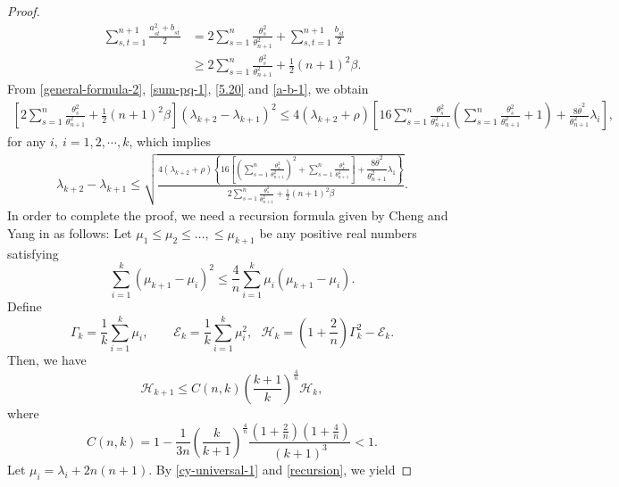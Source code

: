 \documentclass[12pt]{article}
\numberwithin{equation}{section}
\begin{document}
\begin{proof}
\begin{equation}\begin{aligned}\label{a-b-1}\sum^{n+1}_{s,t=1}\frac{a_{s\overline{t}}^{2}+b_{s\overline{t}}}{2}&=2\sum^{n}_{s=1}\frac{\theta_{s}^{2}}{\theta_{n+1}^{2}}
+\sum_{s,t=1}^{n+1}\frac{b_{s\overline{t}}}{2}\\&\geq2\sum^{n}_{s=1}\frac{\theta_{s}^{2}}{\theta_{n+1}^{2}}+\frac{1}{2}(n+1)^{2}\beta.\end{aligned}\end{equation}
From \eqref{general-formula-2}, \eqref{sum-pq-1}, \eqref{5.20} and \eqref{a-b-1}, we obtain
\begin{equation*}\begin{aligned}\left[2\sum^{n}_{s=1}\frac{\theta_{s}^{2}}{\theta_{n+1}^{2}}+\frac{1}{2}(n+1)^{2}\beta\right]\left(\lambda_{k+2}-\lambda_{k+1}\right)^{2}
\leq4(\lambda_{k+2}+\rho)\left[16\sum^{n}_{s=1}\frac{\theta_{s}^{2}}{\theta_{n+1}^{2}}\left(\sum^{n}_{s=1}\frac{\theta_{s}^{2}}{\theta_{n+1}^{2}} + 1\right)
+\frac{8\overline{\theta}^{2}}{\theta^{2}_{n+1}}\lambda_{i}\right],
\end{aligned}\end{equation*}for any $i,~i=1,2,\cdots,k$, which implies
 \begin{equation}\begin{aligned}\label{po-gap-1}\lambda_{k+2}-\lambda_{k+1}
\leq\sqrt{\frac{4(\lambda_{k+2}+\rho)\left\{16\left[\left(\sum^{n}_{s=1}\frac{\theta_{s}^{2}}{\theta_{n+1}^{2}} \right)^{2}
+\sum^{n}_{s=1}\frac{\theta_{s}^{4}}{\theta_{n+1}^{4}}\right]+\dfrac{8\overline{\theta}^{2}}{\theta^{2}_{n+1}}\lambda_{1}\right\}}
{2\sum^{n}_{s=1}\frac{\theta_{s}^{2}}{\theta_{n+1}^{2}}+\frac{1}{2}(n+1)^{2}\beta}}.
\end{aligned}\end{equation} In order to complete the proof, we need a recursion formula given by Cheng and Yang in \cite{CY3} as follows:
Let  $\mu_1 \leq  \mu_2 \leq  \dots, \leq \mu_{k+1}$ be any positive
real numbers satisfying
\begin{equation*}
  \sum_{i=1}^k(\mu_{k+1}-\mu_i)^2 \le
 \frac 4n\sum_{i=1}^k\mu_i(\mu_{k+1} -\mu_i).
\end{equation*}
 Define
 \begin{equation*}
 \Gamma_k=\frac 1k\sum_{i=1}^k\mu_i,\qquad \mathcal{E}_k=\frac 1k
\sum_{i=1}^k\mu_i^2, \ \ \ \mathcal{H}_k=\left (1+\frac 2n \right
)\Gamma_k^2-\mathcal{E}_k.
\end{equation*}
Then, we have
\begin{equation}\label{recursion}
\mathcal{H}_{k+1}\leq C(n,k) \left ( \frac {k+1}k \right )^{\frac 4n}\mathcal{H}_k,
\end{equation}
where
$$
C(n,k) =1-\frac 1{3n}
  \left (\frac k{k+1}\right )^{\frac
  4n}\frac {\left(1+\frac 2n\right )\left (1+
  \frac 4n\right )}{(k+1)^3}<1.
$$
 Let  $\mu_{i}=\lambda_{i}+2n(n+1)$. By \eqref{cy-universal-1} and \eqref{recursion}, we yield


\end{proof}
\end{document}
